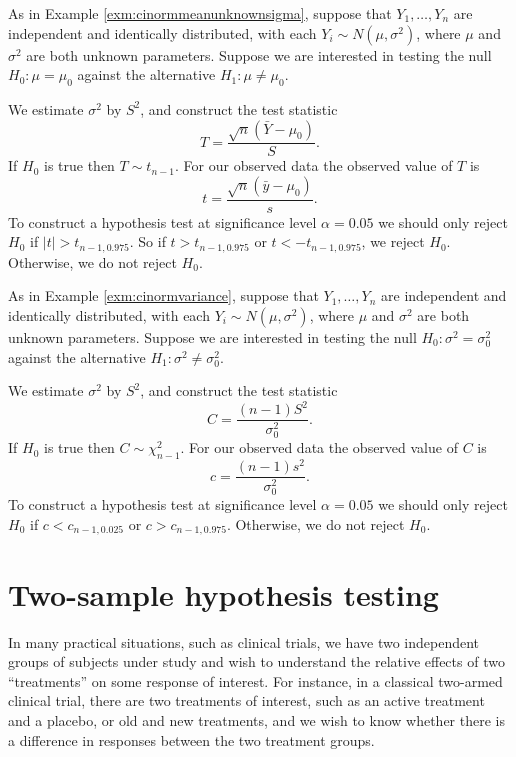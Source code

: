\documentclass[]{book}
\theoremstyle{definition}
\theoremstyle{definition}
\theoremstyle{definition}
\theoremstyle{remark}
\let\BeginKnitrBlock\begin \let\EndKnitrBlock\end
\begin{document}
\BeginKnitrBlock{example}[Normal mean, unknown variance]
\protect\hypertarget{exm:unnamed-chunk-107}{}{\label{exm:unnamed-chunk-107}
\iffalse (Normal mean, unknown variance) \fi{} }As in Example
\ref{exm:cinormmeanunknownsigma}, suppose that \(Y_1, \ldots, Y_n\) are
independent and identically distributed, with each
\(Y_i \sim N(\mu, \sigma^2)\), where \(\mu\) and \(\sigma^2\) are both
unknown parameters. Suppose we are interested in testing the null
\(H_0: \mu = \mu_0\) against the alternative \(H_1: \mu \not = \mu_0\).

We estimate \(\sigma^2\) by \(S^2\), and construct the test statistic
\[T = \frac{\sqrt{n}(\bar Y - \mu_0)}{S}.\] If \(H_0\) is true then
\(T \sim t_{n-1}\). For our observed data the observed value of \(T\) is
\[t =  \frac{\sqrt{n}(\bar y - \mu_0)}{s}.\] To construct a hypothesis
test at significance level \(\alpha = 0.05\) we should only reject
\(H_0\) if \(|t| > t_{n-1, 0.975}\). So if \(t > t_{n-1, 0.975}\) or
\(t < -t_{n-1, 0.975}\), we reject \(H_0\). Otherwise, we do not reject
\(H_0\).
\EndKnitrBlock{example}

\BeginKnitrBlock{example}[Normal variance]
\protect\hypertarget{exm:unnamed-chunk-108}{}{\label{exm:unnamed-chunk-108}
\iffalse (Normal variance) \fi{} }As in Example
\ref{exm:cinormvariance}, suppose that \(Y_1, \ldots, Y_n\) are
independent and identically distributed, with each
\(Y_i \sim N(\mu, \sigma^2)\), where \(\mu\) and \(\sigma^2\) are both
unknown parameters. Suppose we are interested in testing the null
\(H_0: \sigma^2 = \sigma^2_0\) against the alternative
\(H_1: \sigma^2 \not = \sigma^2_0\).

We estimate \(\sigma^2\) by \(S^2\), and construct the test statistic
\[C = \frac{(n-1) S^2}{\sigma_0^2}.\] If \(H_0\) is true then
\(C \sim \chi^2_{n-1}\). For our observed data the observed value of
\(C\) is \[c =  \frac{(n-1) s^2}{\sigma_0^2}.\] To construct a
hypothesis test at significance level \(\alpha = 0.05\) we should only
reject \(H_0\) if \(c < c_{n-1, 0.025}\) or \(c > c_{n-1, 0.975}\).
Otherwise, we do not reject \(H_0\).
\EndKnitrBlock{example}

\section{Two-sample hypothesis
testing}\label{two-sample-hypothesis-testing}

In many practical situations, such as clinical trials, we have two
independent groups of subjects under study and wish to understand the
relative effects of two ``treatments'' on some response of interest. For
instance, in a classical two-armed clinical trial, there are two
treatments of interest, such as an active treatment and a placebo, or
old and new treatments, and we wish to know whether there is a
difference in responses between the two treatment groups.
\end{document}
